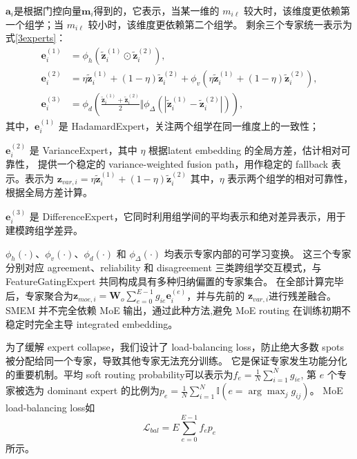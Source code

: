 \documentclass[journal]{IEEEtran}
\begin{document}
$\mathbf{a}_i$是根据门控向量$\mathbf{m}_i$得到的，它表示，当某一维的 $m_{i\ell}$ 较大时，该维度更依赖第一个组学；当 $m_{i\ell}$ 较小时，该维度更依赖第二个组学。
剩余三个专家统一表示为式\ref{3experts}：
\begin{equation}
    \label{3experts}
    \begin{aligned}
\mathbf{e}_{i}^{(1)}&=\phi_h\left(\widetilde{\mathbf{z}}_{i}^{(1)}\odot\widetilde{\mathbf{z}}_{i}^{(2)}\right),\\
\mathbf{e}_{i}^{(2)}&=\eta\widetilde{\mathbf{z}}_{i}^{(1)}+(1-\eta)\widetilde{\mathbf{z}}_{i}^{(2)}+
\phi_v\left(\eta\widetilde{\mathbf{z}}_{i}^{(1)}+(1-\eta)\widetilde{\mathbf{z}}_{i}^{(2)}\right),\\
\mathbf{e}_{i}^{(3)}&=\phi_d\left(\frac{\widetilde{\mathbf{z}}_{i}^{(1)}+\widetilde{\mathbf{z}}_{i}^{(2)}}{2}\Vert
\phi_{\Delta}\left(\left|\widetilde{\mathbf{z}}_{i}^{(1)}-\widetilde{\mathbf{z}}_{i}^{(2)}\right|\right)\right),
\end{aligned}
\end{equation}
其中，$\mathbf{e}_{i}^{(1)}$ 是 HadamardExpert，关注两个组学在同一维度上的一致性；

$\mathbf{e}_{i}^{(2)}$ 是 VarianceExpert，其中 $\eta$ 根据latent embedding 的全局方差，估计相对可靠性，
提供一个稳定的 variance-weighted fusion path，用作稳定的 fallback 表示。表示为
    $\mathbf{z}_{var,i}=\eta\widetilde{\mathbf{z}}_{i}^{(1)}+(1-\eta)\widetilde{\mathbf{z}}_{i}^{(2)}$
其中，$\eta$ 表示两个组学的相对可靠性，根据全局方差计算。

$\mathbf{e}_{i}^{(3)}$ 是 DifferenceExpert，它同时利用组学间的平均表示和绝对差异表示，用于建模跨组学差异。

$\phi_h(\cdot)$、$\phi_v(\cdot)$、$\phi_d(\cdot)$ 和 $\phi_{\Delta}(\cdot)$ 均表示专家内部的可学习变换。
这三个专家分别对应 agreement、reliability 和 disagreement 三类跨组学交互模式，与 FeatureGatingExpert 共同构成具有多种归纳偏置的专家集合。
在全部计算完毕后，专家聚合为$\mathbf{z}_{moe,i}=\mathbf{W}_o\sum_{e=0}^{E-1}g_{ie}\mathbf{e}_{i}^{(e)}$，并与先前的
$\mathbf{z}_{var,i}$进行残差融合。SMEM 并不完全依赖 MoE 输出，通过此种方法,避免 MoE routing 在训练初期不稳定时完全主导 integrated embedding。

为了缓解 expert collapse，我们设计了 load-balancing loss，防止绝大多数 spots 被分配给同一个专家，导致其他专家无法充分训练。
它是保证专家发生功能分化的重要机制。平均 soft routing probability可以表示为$f_e=\frac{1}{N}\sum_{i=1}^{N}g_{ie}$,
第 $e$ 个专家被选为 dominant expert 的比例为$p_e=\frac{1}{N}\sum_{i=1}^{N}\mathbb{I}\left(e=\arg\max_j g_{ij}\right)$。
MoE load-balancing loss如
\begin{equation}
\mathcal{L}_{bal}=E\sum_{e=0}^{E-1}f_ep_e
\end{equation}
所示。
\end{document}
